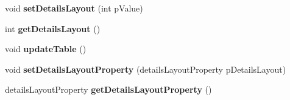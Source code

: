 \begin{DoxyCompactItemize}
\item 
\hypertarget{classQEFileBrowser_a4b999536bcfdb689a8974b4924335409}{
void {\bfseries setDetailsLayout} (int pValue)}
\label{classQEFileBrowser_a4b999536bcfdb689a8974b4924335409}

\item 
\hypertarget{classQEFileBrowser_a5e8e12d681b4d12ba154b807ffa8b0b5}{
int {\bfseries getDetailsLayout} ()}
\label{classQEFileBrowser_a5e8e12d681b4d12ba154b807ffa8b0b5}

\item 
\hypertarget{classQEFileBrowser_a5036deb2585cfa287cec830caf930218}{
void {\bfseries updateTable} ()}
\label{classQEFileBrowser_a5036deb2585cfa287cec830caf930218}

\item 
\hypertarget{classQEFileBrowser_aa58fccab18f07157dc9454f3c48f792a}{
void {\bfseries setDetailsLayoutProperty} (detailsLayoutProperty pDetailsLayout)}
\label{classQEFileBrowser_aa58fccab18f07157dc9454f3c48f792a}

\item 
\hypertarget{classQEFileBrowser_aea221ed78ec980e138e80e535532f5b8}{
detailsLayoutProperty {\bfseries getDetailsLayoutProperty} ()}
\label{classQEFileBrowser_aea221ed78ec980e138e80e535532f5b8}

\end{DoxyCompactItemize}
